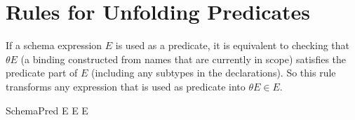 \documentclass{article}
\begin{document}
\section{Rules for Unfolding Predicates}

If a schema expression $E$ is used as a predicate, it is equivalent to
checking that $\theta E$ (a binding constructed from names that are
currently in scope) satisfies the predicate part of $E$ 
(including any subtypes in the declarations).  So this rule
transforms any expression that is used as predicate into $\theta E \in E$.
\begin{zedrule}{SchemaPred}
  E \iff \theta E \in E
\end{zedrule}


\end{document}
